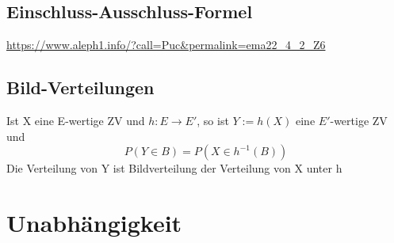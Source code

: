 \documentclass{article}
\begin{document}
\subsection{Einschluss-Ausschluss-Formel}
\url{https://www.aleph1.info/?call=Puc&permalink=ema22_4_2_Z6}

\subsection{Bild-Verteilungen}
Ist X eine E-wertige ZV und $h : E → E'$, so ist $Y := h(X)$ eine $E'$-wertige ZV und
 \[P(Y \in B) = P(X \in h^{-1}(B))\]
Die Verteilung von Y ist Bildverteilung der Verteilung von X unter h

\section{Unabhängigkeit}
\end{document}
